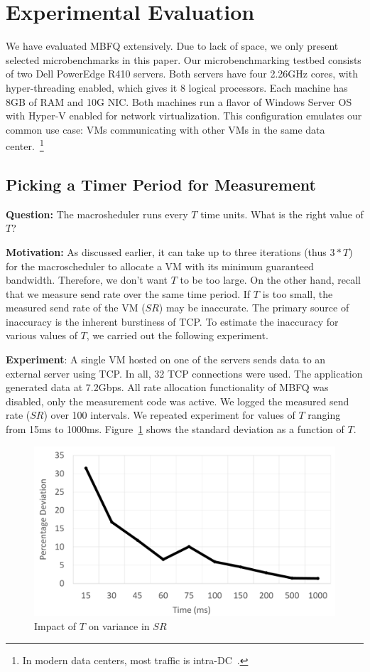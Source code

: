 \section{Experimental Evaluation}
\label{sec:experiments}

We have evaluated MBFQ extensively. Due to lack of space, we only present
selected microbenchmarks in this paper. Our microbenchmarking testbed consists
of two Dell PowerEdge R410 servers.  Both servers have four 2.26GHz cores, with
hyper-threading enabled, which gives it 8 logical processors.  Each machine has
8GB of RAM and 10G NIC.  Both machines run a flavor of Windows Server OS with
Hyper-V enabled for network virtualization. This configuration emulates our
common use case: VMs communicating with other VMs in the same data
center.~\footnote{In modern data centers, most traffic is
intra-DC~\cite{fb,kandula09}.} 

\subsection{Picking a Timer Period for Measurement}
{\bf Question:}  The macrosheduler runs every $T$ time units. What is the right
value of $T$?

{\bf Motivation:}  As discussed earlier, it can take up to three iterations (thus
$3*T$) for the macroscheduler to allocate a VM with its minimum
guaranteed bandwidth. Therefore, we don't want $T$ to be too large. On the other hand,
recall that we measure send rate over the same time period. If $T$ is too small,
the measured send rate of the VM ($SR$) may be inaccurate. The primary source of
inaccuracy is the inherent burstiness of TCP. To estimate the inaccuracy for
various values of $T$, we carried out the following experiment.

{\bf Experiment}: A single VM hosted on one of the servers sends data to
an external server using TCP. In all, 32 TCP connections were used. The application 
generated data at 7.2Gbps. All rate
allocation functionality of MBFQ was disabled, only the measurement code was
active.  We logged the measured send rate ($SR$) over 100 intervals.  We
repeated experiment for values of $T$ ranging from 15ms to 1000ms.
Figure~\ref{variation} shows the standard deviation as a function of $T$.  

\begin{figure}
\centering
\includegraphics[width=0.7\columnwidth, trim=60pt 20mm 0pt 8mm]{figures/variation}
\caption{Impact of $T$ on variance in $SR$}
\label{variation}
\vspace{-3mm}
\end{figure}

